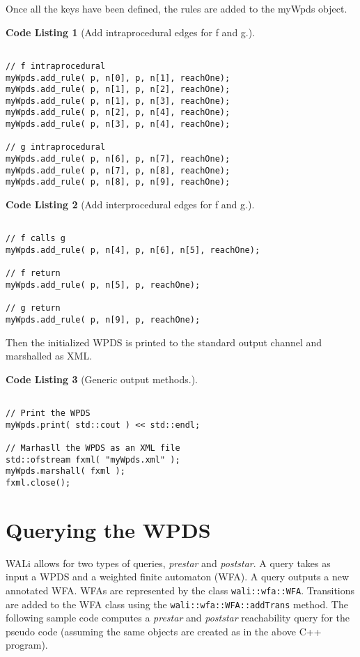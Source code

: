 \documentclass[english,a4paper,11pt]{article}
\theoremstyle{definition}
\newtheorem{codelist}{Code Listing}[section]
\def\WALi{\textsf{WALi}\xspace}
\begin{document}
Once all the keys have been defined, the rules are added to the
myWpds object.
\begin{codelist}[Add intraprocedural edges for f and g.]
\label{Intra}
\begin{lstlisting}

// f intraprocedural
myWpds.add_rule( p, n[0], p, n[1], reachOne);
myWpds.add_rule( p, n[1], p, n[2], reachOne);
myWpds.add_rule( p, n[1], p, n[3], reachOne);
myWpds.add_rule( p, n[2], p, n[4], reachOne);
myWpds.add_rule( p, n[3], p, n[4], reachOne);

// g intraprocedural
myWpds.add_rule( p, n[6], p, n[7], reachOne);
myWpds.add_rule( p, n[7], p, n[8], reachOne);
myWpds.add_rule( p, n[8], p, n[9], reachOne);
\end{lstlisting}
\end{codelist}

\begin{codelist}[Add interprocedural edges for f and g.]
\label{Intrer}
\begin{lstlisting}

// f calls g
myWpds.add_rule( p, n[4], p, n[6], n[5], reachOne);

// f return
myWpds.add_rule( p, n[5], p, reachOne);

// g return
myWpds.add_rule( p, n[9], p, reachOne);
\end{lstlisting}
\end{codelist}

Then the initialized WPDS is printed to the standard output
channel and marshalled as XML.
\begin{codelist}[Generic output methods.]
\label{Output}
\begin{lstlisting}

// Print the WPDS
myWpds.print( std::cout ) << std::endl;

// Marhasll the WPDS as an XML file
std::ofstream fxml( "myWpds.xml" );
myWpds.marshall( fxml );
fxml.close();
\end{lstlisting}
\end{codelist}


\section{Querying the WPDS}
\label{Se:Query}

\WALi allows for two types of queries, \emph{prestar} and \emph{poststar}. A
query takes as input a WPDS and a weighted finite automaton (WFA). A query
outputs a new annotated WFA\@. WFAs are represented by the class
\verb!wali::wfa::WFA!. Transitions are added to the WFA class using the
\verb!wali::wfa::WFA::addTrans! method. The following sample code computes a
\emph{prestar} and \emph{poststar} reachability query for the pseudo code
(assuming the same objects are created as in the above C++ program).
\end{document}
